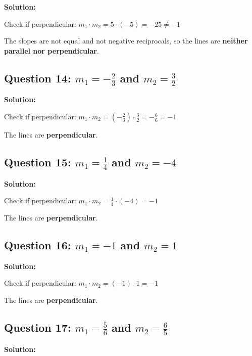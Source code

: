 \documentclass[12pt]{article}
\begin{document}
\noindent\textbf{Solution:}

Check if perpendicular: $m_1 \cdot m_2 = 5 \cdot (-5) = -25 \neq -1$

The slopes are not equal and not negative reciprocals, so the lines are \textbf{neither parallel nor perpendicular}.

\vspace{0.3cm}

\subsection*{Question 14: $m_1 = -\frac{2}{3}$ and $m_2 = \frac{3}{2}$}

\noindent\textbf{Solution:}

Check if perpendicular: $m_1 \cdot m_2 = \left(-\frac{2}{3}\right) \cdot \frac{3}{2} = -\frac{6}{6} = -1$

The lines are \textbf{perpendicular}.

\vspace{0.3cm}

\subsection*{Question 15: $m_1 = \frac{1}{4}$ and $m_2 = -4$}

\noindent\textbf{Solution:}

Check if perpendicular: $m_1 \cdot m_2 = \frac{1}{4} \cdot (-4) = -1$

The lines are \textbf{perpendicular}.

\vspace{0.3cm}

\subsection*{Question 16: $m_1 = -1$ and $m_2 = 1$}

\noindent\textbf{Solution:}

Check if perpendicular: $m_1 \cdot m_2 = (-1) \cdot 1 = -1$

The lines are \textbf{perpendicular}.

\vspace{0.3cm}

\subsection*{Question 17: $m_1 = \frac{5}{6}$ and $m_2 = \frac{6}{5}$}

\noindent\textbf{Solution:}
\end{document}
